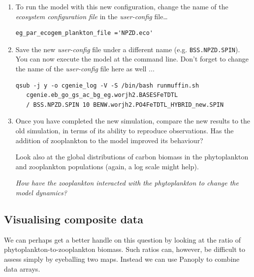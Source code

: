 \documentclass[11pt,fleqn]{book} %
\begin{document}
\begin{enumerate}[noitemsep]
\item  To run the model with this new configuration, change the name of the \textit{ecosystem configuration file} in the \textit{user-config} file\dots
\small\begin{verbatim}
eg_par_ecogem_plankton_file ='NPZD.eco'
\end{verbatim}\normalsize

\item Save the new \textit{user-config} file under a different name (e.g. \texttt{BSS.NPZD.SPIN}). You can now execute the model at the command line. Don't forget to change the name of the \textit{user-config} file here as well ...
\small\begin{verbatim}
qsub -j y -o cgenie_log -V -S /bin/bash runmuffin.sh 
   cgenie.eb_go_gs_ac_bg_eg.worjh2.BASESFeTDTL
   / BSS.NPZD.SPIN 10 BENW.worjh2.PO4FeTDTL_HYBRID_new.SPIN
\end{verbatim}\normalsize

\item Once you have completed the new simulation, compare the new results to the old simulation, in terms of its ability to reproduce observations. Has the addition of zooplankton to the model improved its behaviour?

Look also at the global distributions of carbon biomass in the phytoplankton and zooplankton populations (again, a log scale might help). 

\textit{How have the zooplankton interacted with the phytoplankton to change the model dynamics?}

\end{enumerate}
\vspace{2mm}


\subsection{Visualising composite data}

We can perhaps get a better handle on this question by looking at the ratio of phytoplankton-to-zooplankton biomass. Such ratios can, however, be difficult to assess simply by eyeballing two maps. Instead we can use Panoply to combine data arrays.
\end{document}
